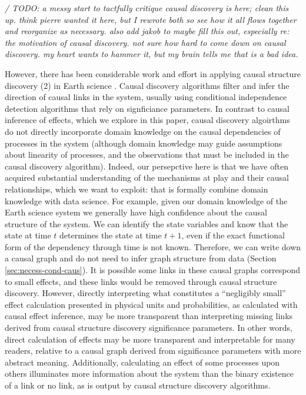 \documentclass[12pt]{article}
\begin{document}
\textit{/ TODO: a messy start to tactfully critique causal discovery
  is here; clean this up. think pierre wanted it here, but I rewrote
  both so see how it all flows together and reorganize as
  necessary. also add jakob to maybe fill this out, especially re: the
  motivation of causal discovery. not sure how hard to come down on
  causal discovery. my heart wants to hammer it, but my brain tells me
  that is a bad idea.}

However, there has been considerable work and effort in applying
causal structure discovery (2) in Earth science
\citep[e.g.,][]{ebert-uphoff2012,
  samarasinghe-casuality,runge-causal-timeseries,runge2019inferring,goodwell-causality-2020}. Causal
discovery algorithms filter and infer the direction of causal links in
the system, usually using conditional independence detection
algorithms that rely on signficiance parameters. In contrast to causal
inference of effects, which we explore in this paper, causal discovery
algoirthms do not directly incorporate domain knowledge on the causal
dependencies of processes in the system (although domain knowledge may
guide assumptions about linearity of processes, and the observations
that must be included in the causal discovery algorithm). Indeed, our
persepctive here is that we have often acquired substantial
understanding of the mechanisms at play and their causal
relationships, which we want to exploit: that is formally combine
domain knowledge with data science. For example, given our domain
knowledge of the Earth science system we generally have high
confidence about the causal structure of the system. We can identify
the state variables and know that the state at time \(t\) determines
the state at time \(t+1\), even if the exact functional form of the
dependency through time is not known. Therefore, we can write down a
causal graph and do not need to infer graph structure from data
(Section \ref{sec:necess-cond-caus}). It is possible some links in
these causal graphs correspond to small effects, and these links would
be removed through causal structure discovery. However, directly
interpreting what constitutes a ``negligibly small'' effect
calculation presented in physical units and probabilities, as
calculated with causal effect inference, may be more transparent than
interpreting missing links derived from causal structure discovery
significance parameters. In other words, direct calculation of effects
may be more transparent and interpretable for many readers, relative
to a causal graph derived from significance parameters with more
abstract meaning. Additionally, calculating an effect of some
processes upon others illuminates more information about the system
than the binary existence of a link or no link, as is output by causal
structure discovery algorithms.
\end{document}
